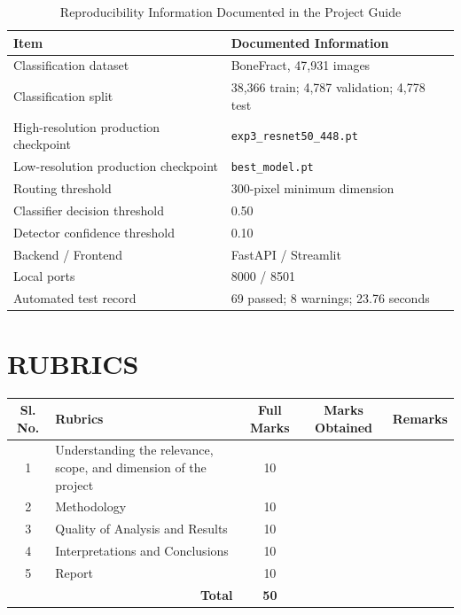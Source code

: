 \documentclass{article}
\begin{document}
\begin{table}[htbp]
\centering
\caption{Reproducibility Information Documented in the Project Guide}
\label{tab:reproducibility}
\begin{tabular}{ll}
\toprule
\textbf{Item} & \textbf{Documented Information} \\
\midrule
Classification dataset & BoneFract, 47,931 images \\
Classification split & 38,366 train; 4,787 validation; 4,778 test \\
High-resolution production checkpoint & \texttt{exp3\_resnet50\_448.pt} \\
Low-resolution production checkpoint & \texttt{best\_model.pt} \\
Routing threshold & 300-pixel minimum dimension \\
Classifier decision threshold & 0.50 \\
Detector confidence threshold & 0.10 \\
Backend / Frontend & FastAPI / Streamlit \\
Local ports & 8000 / 8501 \\
Automated test record & 69 passed; 8 warnings; 23.76 seconds \\
\bottomrule
\end{tabular}
\end{table}

\newpage
\section*{RUBRICS}

\begin{table}[htbp]
\centering
\renewcommand{\arraystretch}{1.3}
\begin{tabular}{|c|p{8cm}|c|c|p{3.5cm}|}
\hline
\textbf{Sl. No.} & \textbf{Rubrics} & \textbf{Full Marks} & \textbf{Marks Obtained} & \textbf{Remarks} \\ \hline
1 & Understanding the relevance, scope, and dimension of the project & 10 & & \\ \hline
2 & Methodology & 10 & & \\ \hline
3 & Quality of Analysis and Results & 10 & & \\ \hline
4 & Interpretations and Conclusions & 10 & & \\ \hline
5 & Report & 10 & & \\ \hline
\multicolumn{2}{|r|}{\textbf{Total}} & \textbf{50} & & \\ \hline
\end{tabular}
\end{table}
\end{document}
